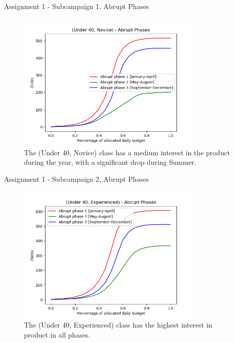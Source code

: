 \documentclass[11pt]{beamer}
\begin{document}
\begin{frame}{Assignment 1 - Subcampaign 1, Abrupt Phases}
\begin{figure}[hbtp]
\centering
\includegraphics[width=0.8\textwidth]{images/subcampaign_2_abrupt_phases.png}
\caption{The (Under 40, Novice) class has a medium interest in the product during the year, with a significant drop during Summer.}
\end{figure}
\end{frame}

\begin{frame}{Assignment 1 - Subcampaign 2, Abrupt Phases}
\begin{figure}[hbtp]
\centering
\includegraphics[width=0.8\textwidth]{images/subcampaign_3_abrupt_phases.png}
\caption{The (Under 40, Experienced) class has the highest interest in product in all phases.}
\end{figure}
\end{frame}
\end{document}
